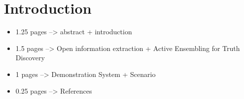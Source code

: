 \section{Introduction}
\begin{itemize}
 \item 1.25 pages --> abstract + introduction
 \item 1.5 pages --> Open information extraction + Active Ensembling for Truth Discovery 
 \item 1 pages --> Demonstration System + Scenario
 \item 0.25 pages --> References
\end{itemize}
